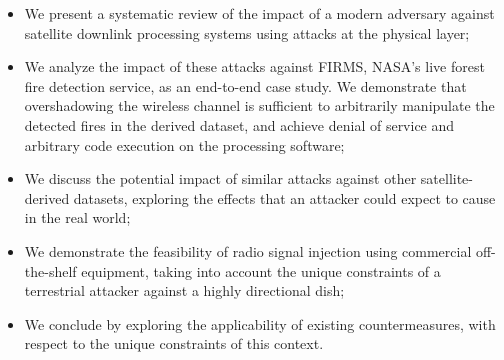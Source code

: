 \begin{itemize}
    \item We present a systematic review of the impact of a modern adversary against satellite downlink processing systems using attacks at the physical layer;
    \item We analyze the impact of these attacks against FIRMS, NASA's live forest fire detection service, as an end-to-end case study. We demonstrate that overshadowing the wireless channel is sufficient to arbitrarily manipulate the detected fires in the derived dataset, and achieve denial of service and arbitrary code execution on the processing software;
    \item We discuss the potential impact of similar attacks against other satellite-derived datasets, exploring the effects that an attacker could expect to cause in the real world;
    \item We demonstrate the feasibility of radio signal injection using commercial off-the-shelf equipment, taking into account the unique constraints of a terrestrial attacker against a highly directional dish;
    \item We conclude by exploring the applicability of existing countermeasures, with respect to the unique constraints of this context.
\end{itemize}







